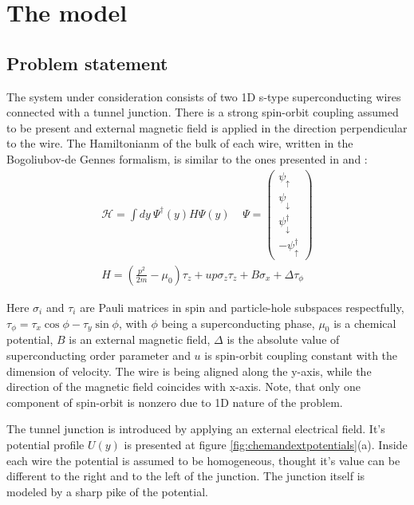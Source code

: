 \newcommand{\xbr}{\left(x\right)}
\newcommand{\br}[1]{\left(#1\right)}
\newcommand{\abs}[1]{\left|#1\right|}

\chapter{The model}

\section{Problem statement}

The system under consideration consists of two 1D s-type superconducting wires connected with a tunnel junction. There is a strong spin-orbit coupling assumed to be present and external magnetic field is applied in the direction perpendicular to the wire. The Hamiltonianm of the bulk of each wire, written in the Bogoliubov-de Gennes formalism, is similar to the ones presented in \cite{Oreg_2010} and \cite{Lutchyn_2010}:
\begin{gather}
	\mathcal{H}
	=
	\int dy ~
	\Psi^\dagger
	\br{y}
	H
	\Psi
	\br{y}
	\
	~~~~
	\Psi
	=
	\begin{pmatrix}
		\psi_\uparrow
		\\
		\psi_\downarrow
		\\
		\psi_\downarrow^\dagger
		\\
		-\psi_\uparrow^\dagger
	\end{pmatrix}
	\\
	\label{bulk_Hamiltonian}
	H
	=
	\br{
		\frac{p^2}{2m}
		-\mu_0
	}\tau_z
	+
	u p \sigma_z \tau_z
	+
	B\sigma_x	
	+
	\Delta\tau_\phi
\end{gather}

Here $ \sigma_i $ and $ \tau_i $ are Pauli matrices in spin and particle-hole subspaces respectfully, $ \tau_\phi = \tau_x \cos\phi - \tau_y \sin\phi$, with $ \phi $ being a superconducting phase, $ \mu_0 $ is a chemical potential, $ B $ is an external magnetic field, $ \Delta $ is the absolute value of superconducting order parameter and $ u $ is spin-orbit coupling constant with the dimension of velocity. The wire is being aligned along the y-axis, while the direction of the magnetic field coincides with x-axis. Note, that only one component of spin-orbit is nonzero due to 1D nature of the problem.

The tunnel junction is introduced  by applying an external electrical field. It's potential profile $U\br{y}  $ is presented at figure \ref{fig:chemandextpotentials}(a). Inside each wire the potential is assumed to be homogeneous, thought it's value can be different to the right and to the left of the junction. The junction itself is modeled by a sharp pike of the potential.
 
